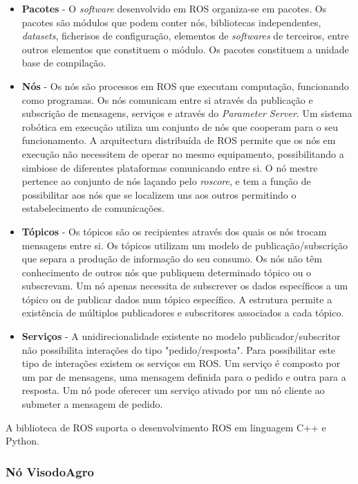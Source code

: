 \begin{itemize}
	\item \textbf{Pacotes} - O \textit{software} desenvolvido em ROS organiza-se em pacotes. Os pacotes são módulos que podem conter nós, bibliotecas independentes, \textit{datasets}, ficherisos de configuração, elementos de \textit{softwares} de terceiros, entre outros elementos que constituem o módulo. Os pacotes constituem a unidade base de compilação.
	\item \textbf{Nós} - Os nós são processos em ROS que executam computação, funcionando como programas. Os nós comunicam entre si através da publicação e subscrição de mensagens, serviços e através do \textit{Parameter Server}. Um sistema robótica em execução utiliza um conjunto de nós que cooperam para o seu funcionamento. A arquitectura distribuída de ROS permite que os nós em execução não necessitem de operar no mesmo equipamento, possibilitando a simbiose de diferentes plataformas comunicando entre si. O nó mestre pertence ao conjunto de nós laçando pelo \textit{roscore}, e tem a função de possibilitar aos nós que se localizem uns aos outros permitindo o estabelecimento de comunicações. 
	\item \textbf{Tópicos} - Os tópicos são os recipientes através dos quais os nós trocam mensagens  entre si. Os tópicos utilizam um modelo de publicação/subscrição que separa a produção de informação do seu consumo. Os nós não têm conhecimento de outros nós que publiquem determinado tópico ou o subscrevam. Um nó apenas necessita de subscrever os dados específicos a um tópico ou de publicar dados num tópico específico. A estrutura permite a existência de múltiplos publicadores e subscritores associados a cada tópico.
	\item \textbf{Serviços} - A unidirecionalidade existente no modelo publicador/subscritor não possibilita interações do tipo "pedido/resposta". Para possibilitar este tipo de interações existem os serviços em ROS. Um serviço é composto por um par de mensagens, uma mensagem definida para o pedido e outra para a resposta. Um nó pode oferecer um serviço ativado por um nó cliente ao submeter a mensagem de pedido.
 
\end{itemize}

A biblioteca de ROS suporta o desenvolvimento ROS em linguagem C++ e Python.


\subsubsection{Nó VisodoAgro}

